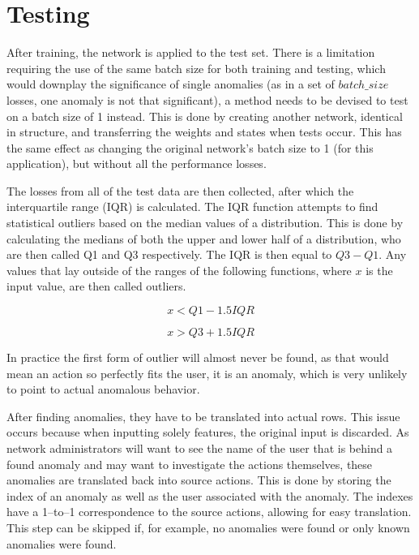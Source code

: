 \section{Testing}\label{sec:methods:testing}
After training, the network is applied to the test set. There is a limitation requiring the use of the same batch size for both training and testing, which would downplay the significance of single anomalies (as in a set of \(batch\_size\) losses, one anomaly is not that significant), a method needs to be devised to test on a batch size of 1 instead. This is done by creating another network, identical in structure, and transferring the weights and states when tests occur. This has the same effect as changing the original network's batch size to 1 (for this application), but without all the performance losses.

The losses from all of the test data are then collected, after which the interquartile range (IQR) is calculated. The IQR function attempts to find statistical outliers based on the median values of a distribution. This is done by calculating the medians of both the upper and lower half of a distribution, who are then called Q1 and Q3 respectively. The IQR is then equal to \(Q3 - Q1\). Any values that lay outside of the ranges of the following functions, where \(x\) is the input value, are then called outliers.

$$ x < Q1 - 1.5 IQR $$

$$ x > Q3 + 1.5 IQR $$

In practice the first form of outlier will almost never be found, as that would mean an action so perfectly fits the user, it is an anomaly, which is very unlikely to point to actual anomalous behavior.

After finding anomalies, they have to be translated into actual rows. This issue occurs because when inputting solely features, the original input is discarded. As network administrators will want to see the name of the user that is behind a found anomaly and may want to investigate the actions themselves, these anomalies are translated back into source actions. This is done by storing the index of an anomaly as well as the user associated with the anomaly. The indexes have a 1--to--1 correspondence to the source actions, allowing for easy translation. This step can be skipped if, for example, no anomalies were found or only known anomalies were found.

